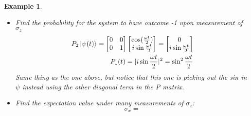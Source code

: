 \documentclass[12pt]{article}
\theoremstyle{plain}
\theoremstyle{nonumberplain}
\theoremstyle{plain}
\newtheorem{example}[lemma]{Example}
\theoremstyle{nonumberplain}
\newcommand\1{{\bf 1}}
\newcommand{\bmat}[1]{\begin{bmatrix*} #1 \end{bmatrix*}} %
\newcommand{\<}{\left\langle}
\renewcommand{\>}{\right\rangle}
\begin{document}
\begin{example}
\begin{itemize}
\begin{equation}
\begin{split}
P_2\ket{\psi(t)} = \bmat{1 &0\\ 0 &0}\bmat{\cos(\frac{\omega t}{2})\\ i\sin{\frac{\omega t}{2}}} = \bmat{\cos(\frac{\omega t}{2}) \\0}\\
P_\downarrow (t) = |\cos{\frac{\omega t}{2}}|^2 = \cos^2{\frac{\omega t}{2}}
\end{split}
\end{equation}
As you can see, we have picked off the cos out of $\psi$ and in order to compute the probability distribution of the wave, we square the final answer, this will look familiar to a probability and statistics class topic of expected values and distributions (because it is... Wow! never thought it would be useful again)  

\pagebreak
\item Find the probability for the system to have outcome -1 upon measurement of $\sigma_z$\\
\begin{equation}
\begin{split}
P_2\ket{\psi(t)} = \bmat{0 &0\\ 0 &1}\bmat{\cos(\frac{\omega t}{2})\\ i\sin{\frac{\omega t}{2}}} = \bmat{0 \\i\sin{\frac{\omega t}{2}}}\\
P_\downarrow (t) = |i\sin{\frac{\omega t}{2}}|^2 = \sin^2{\frac{\omega t}{2}}
\end{split}
\end{equation}
Same thing as the one above, but notice that this one is picking out the sin in $\psi$ instead using the other diagonal term in the P matrix.\\  
\item Find the expectation value under many measurements of $\sigma_z$:\\
\begin{equation}
\sigma_x = 
\end{equation}
\end{itemize}
\end{example}
\end{document}
